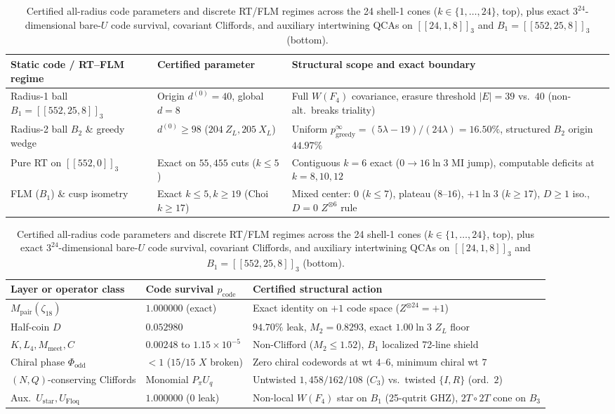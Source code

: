 \begin{table}[tb]
\centering
\caption{Certified all-radius code parameters and discrete RT/FLM regimes across the 24 shell-1 cones
($k \in \{1, \dots, 24\}$, top), plus exact $3^{24}$-dimensional bare-$U$ code survival, covariant Cliffords, and
auxiliary intertwining QCAs on $[[24, 1, 8]]_3$ and $B_1 = [[552, 25, 8]]_3$ (bottom).}
\label{tab:holo-bridge}
\footnotesize
\begin{tabularx}{\textwidth}{@{}>{\raggedright\arraybackslash}p{3.55cm}>{\raggedright\arraybackslash}p{3.45cm}>{\raggedright\arraybackslash}X@{}}
\toprule
Static code / RT--FLM regime & Certified parameter & Structural scope and exact boundary \\
\midrule
Radius-1 ball $B_1 = [[552, 25, 8]]_3$ & Origin $d^{(0)} = 40$, global $d = 8$ & Full $W(F_4)$ covariance, erasure threshold $|E| = 39$ vs.\ $40$ (non-alt.\ breaks triality) \\
Radius-2 ball $B_2$ \& greedy wedge & $d^{(0)} \ge 98$ ($204\ Z_L, 205\ X_L$) & Uniform $p_{\mathrm{greedy}}^\infty = (5\lambda - 19)/(24\lambda) = 16.50\%$, structured $B_2$ origin $44.97\%$ \\
Pure RT on $[[552, 0]]_3$ & Exact on $55{,}455$ cuts ($k \le 5$) & Contiguous $k = 6$ exact ($0 \to 16\ln 3$ MI jump), computable deficits at $k = 8, 10, 12$ \\
FLM ($B_1$) \& cusp isometry & Exact $k \le 5, k \ge 19$ (Choi $k \ge 17$) & Mixed center: $0$ ($k \le 7$), plateau ($8\text{--}16$), $+1\ln 3$ ($k \ge 17$), $D \ge 1$ iso., $D = 0$ $Z^{\otimes 6}$ rule \\
\bottomrule
\end{tabularx}

\vspace{4pt}
\begin{tabularx}{\textwidth}{@{}>{\raggedright\arraybackslash}p{3.55cm}>{\raggedright\arraybackslash}p{3.45cm}>{\raggedright\arraybackslash}X@{}}
\toprule
Layer or operator class & Code survival $p_{\mathrm{code}}$ & Certified structural action \\
\midrule
$M_{\mathrm{pair}}(\zeta_{18})$ & $1.000000$ (exact) & Exact identity on $+1$ code space ($Z^{\otimes 24} = +1$) \\
Half-coin $D$ & $0.052980$ & $94.70\%$ leak, $M_2 = 0.8293$, exact $1.00\ln 3$ $Z_L$ floor \\
$K, L_4, M_{\mathrm{meet}}, C$ & $0.00248$ to $1.15 \times 10^{-5}$ & Non-Clifford ($M_2 \le 1.52$), $B_1$ localized 72-line shield \\
Chiral phase $\Phi_{\mathrm{odd}}$ & $< 1$ ($15/15$ $X$ broken) & Zero chiral codewords at wt $4\text{--}6$, minimum chiral wt $7$ \\
$(N, Q)$-conserving Cliffords & Monomial $P_\pi U_q$ & Untwisted $1{,}458 / 162 / 108$ ($C_3$) vs.\ twisted $\{I, R\}$ (ord.\ $2$) \\
Aux.\ $U_{\mathrm{star}}, U_{\mathrm{Floq}}$ & $1.000000$ ($0$ leak) & Non-local $W(F_4)$ star on $B_1$ (25-qutrit GHZ), $2T \circ 2T$ cone on $B_3$ \\
\bottomrule
\end{tabularx}
\end{table}

